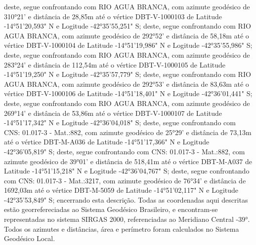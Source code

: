 deste, segue confrontando com RIO AGUA BRANCA, com azimute geodésico de 310°21' e distância de 
28,85m até o vértice DBT-V-1000103 de Latitude -14°51'20,593" N e Logitude -42°35'55,251" S;
deste, segue confrontando com RIO AGUA BRANCA, com azimute geodésico de 292°52' e distância de 
58,18m até o vértice DBT-V-1000104 de Latitude -14°51'19,986" N e Logitude -42°35'55,986" S;
deste, segue confrontando com RIO AGUA BRANCA, com azimute geodésico de 283°24' e distância de 
112,54m até o vértice DBT-V-1000105 de Latitude -14°51'19,250" N e Logitude -42°35'57,779" S;
deste, segue confrontando com RIO AGUA BRANCA, com azimute geodésico de 292°53' e distância de 
83,63m até o vértice DBT-V-1000106 de Latitude -14°51'18,401" N e Logitude -42°36'01,441" S;
deste, segue confrontando com RIO AGUA BRANCA, com azimute geodésico de 269°14' e distância de 
53,86m até o vértice DBT-V-1000107 de Latitude -14°51'17,342" N e Logitude -42°36'04,018" S;
deste, segue confrontando com CNS: 01.017-3 - Mat.:882, com azimute geodésico de 25°29' e distância de 
73,13m até o vértice DBT-M-A036 de Latitude -14°51'17,366" N e Logitude -42°36'05,819" S;
deste, segue confrontando com CNS: 01.017-3 - Mat.:882, com azimute geodésico de 39°01' e distância de 
518,41m até o vértice DBT-M-A037 de Latitude -14°51'15,218" N e Logitude -42°36'04,767" S;
deste, segue confrontando com CNS: 01.017-3 - Mat.:3217, com azimute geodésico de 76°34' e distância de 
1692,03m até o vértice DBT-M-5059 de Latitude -14°51'02,117" N e Logitude -42°35'53,849" S;
 encerrando esta descrição. Todas as coordenadas aqui descritas estão georrefereciadas ao Sistema 
Geodésico Brasileiro, e encontram-se representadas no sistema SIRGAS 2000, referenciadas ao Meridiano Central -39°.
 Todos os azimutes e distâncias, área e perímetro foram calculados no Sistema Geodésico Local.